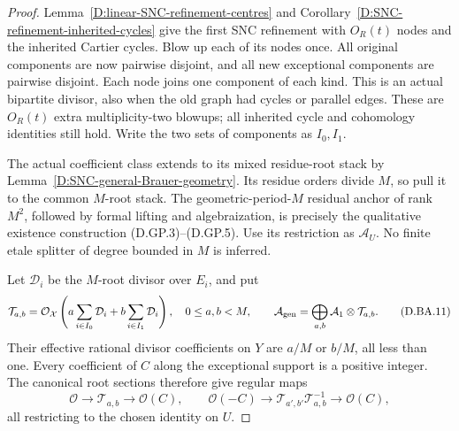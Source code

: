 \begin{proof}
Lemma~\ref{D:linear-SNC-refinement-centres} and
Corollary~\ref{D:SNC-refinement-inherited-cycles} give
the first SNC refinement with $O_R(t)$ nodes and the
inherited Cartier cycles. Blow up each of its nodes once.
All original components are now pairwise disjoint, and all
new exceptional components are pairwise disjoint. Each node
joins one component of each kind. This is an actual bipartite
divisor, also when the old graph had cycles or parallel edges.
These are $O_R(t)$ extra multiplicity-two blowups; all inherited
cycle and cohomology identities still hold. Write the two
sets of components as $I_0,I_1$.

The actual coefficient class extends to its mixed residue-root
stack by Lemma~\ref{D:SNC-general-Brauer-geometry}. Its residue
orders divide $M$, so pull it to the common $M$-root stack.
The geometric-period-$M$ residual anchor of rank $M^2$,
followed by formal lifting and algebraization, is precisely
the qualitative existence construction (D.GP.3)--(D.GP.5).
Use its restriction as $\mathcal A_U$. No finite etale
splitter of degree bounded in $M$ is inferred.

Let $\mathcal D_i$ be the $M$-root divisor over $E_i$, and put
\[
 \mathcal T_{a,b}=\mathcal O_{\mathcal X}
       \left(a\sum_{i\in I_0}\mathcal D_i
                    +b\sum_{i\in I_1}\mathcal D_i\right),
 \quad 0\le a,b<M,\qquad
 \mathcal A_{\rm gen}
       =\bigoplus_{a,b}\mathcal A_1\otimes\mathcal T_{a,b}.
                                                        \tag{D.BA.11}
\]
Their effective rational divisor coefficients on $Y$ are
$a/M$ or $b/M$, all less than one. Every coefficient of
$C$ along the exceptional support is a positive integer.
The canonical root sections therefore give regular maps
\[
 \mathcal O\longrightarrow\mathcal T_{a,b}
                      \longrightarrow\mathcal O(C),
 \qquad
 \mathcal O(-C)\longrightarrow
       \mathcal T_{a',b'}\mathcal T_{a,b}^{-1}
                      \longrightarrow\mathcal O(C),   \tag{D.BA.12}
\]
all restricting to the chosen identity on $U$.


\end{proof}
